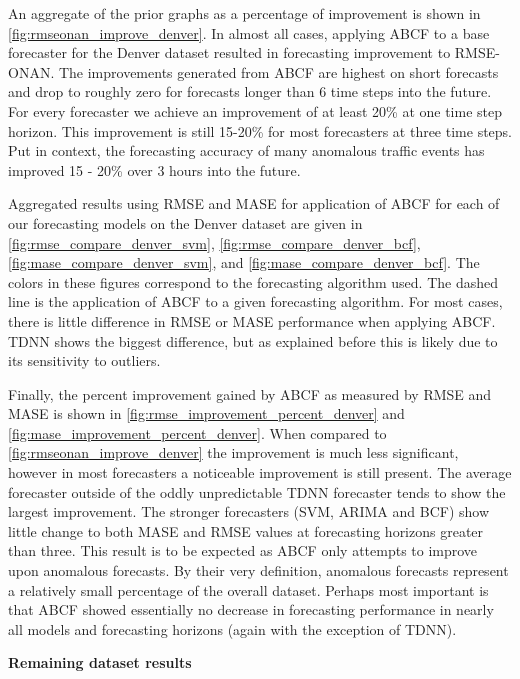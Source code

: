An aggregate of the prior graphs as a percentage of improvement is shown in \ref{fig:rmseonan_improve_denver}.  In almost all cases, applying ABCF to a base forecaster for the Denver dataset resulted in forecasting improvement to RMSE-ONAN.  The improvements generated from ABCF are highest on short forecasts and drop to roughly zero for forecasts longer than 6 time steps into the future.  For every forecaster we achieve an improvement of at least 20\% at one time step horizon.  This improvement is still 15-20\% for most forecasters at three time steps.  Put in context, the forecasting accuracy of many anomalous traffic events has improved 15 - 20\% over 3 hours into the future.

Aggregated results using RMSE and MASE for application of ABCF for each of our forecasting models on the Denver dataset are given in \ref{fig:rmse_compare_denver_svm}, \ref{fig:rmse_compare_denver_bcf}, \ref{fig:mase_compare_denver_svm}, and \ref{fig:mase_compare_denver_bcf}.  The colors in these figures correspond to the forecasting algorithm used.  The dashed line is the application of ABCF to a given forecasting algorithm.  For most cases, there is little difference in RMSE or MASE performance when applying ABCF.  TDNN shows the biggest difference, but as explained before this is likely due to its sensitivity to outliers.  

Finally, the percent improvement gained by ABCF as measured by RMSE and MASE is shown in \ref{fig:rmse_improvement_percent_denver} and \ref{fig:mase_improvement_percent_denver}.  When compared to \ref{fig:rmseonan_improve_denver} the improvement is much less significant, however in most forecasters a noticeable improvement is still present.  The average forecaster outside of the oddly unpredictable TDNN forecaster tends to show the largest improvement.  The stronger forecasters (SVM, ARIMA and BCF) show little change to both MASE and RMSE values at forecasting horizons greater than three.  This result is to be expected as ABCF only attempts to improve upon anomalous forecasts.  By their very definition, anomalous forecasts represent a relatively small percentage of the overall dataset.  Perhaps most important is that ABCF showed essentially no decrease in forecasting performance in nearly all models and forecasting horizons (again with the exception of TDNN).



\bigskip
\noindent \textbf{Remaining dataset results} 

